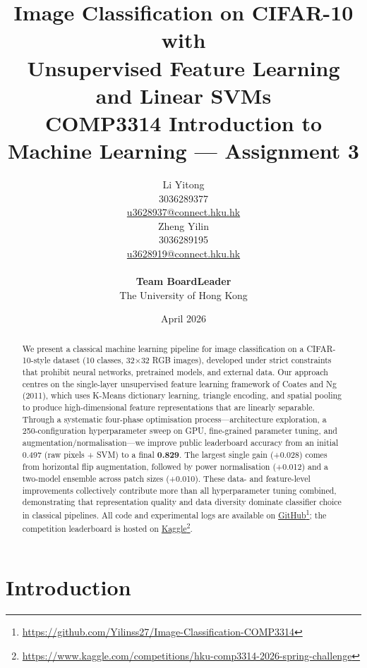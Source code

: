 \documentclass[11pt,a4paper]{article}
\title{%
  \textbf{Image Classification on CIFAR-10 with\\
  Unsupervised Feature Learning and Linear SVMs}\\[6pt]
  \large COMP3314 Introduction to Machine Learning --- Assignment 3
}
\author{%
  \begin{tabular}[t]{c}
    Li Yitong\\
    \small 3036289377\\
    \small \href{mailto:u3628937@connect.hku.hk}{u3628937@connect.hku.hk}
  \end{tabular}
  \hspace{3em}
  \begin{tabular}[t]{c}
    Zheng Yilin\\
    \small 3036289195\\
    \small \href{mailto:u3628919@connect.hku.hk}{u3628919@connect.hku.hk}
  \end{tabular}
  \\[40pt]
  \small\textbf{Team BoardLeader}\\
  \small The University of Hong Kong
}
\date{April 2026}
\begin{document}
\maketitle

\begin{abstract}
We present a classical machine learning pipeline for image classification on a
CIFAR-10-style dataset (10 classes, 32$\times$32 RGB images), developed under
strict constraints that prohibit neural networks, pretrained models, and
external data.  Our approach centres on the single-layer unsupervised feature
learning framework of Coates and Ng (2011), which uses K-Means dictionary
learning, triangle encoding, and spatial pooling to produce high-dimensional
feature representations that are linearly separable.  Through a systematic
four-phase optimisation process---architecture exploration, a 250-configuration
hyperparameter sweep on GPU, fine-grained parameter tuning, and
augmentation/normalisation---we improve public leaderboard accuracy from an
initial 0.497 (raw pixels + SVM) to a final \textbf{0.829}.  The largest
single gain (+0.028) comes from horizontal flip augmentation, followed by
power normalisation (+0.012) and a two-model ensemble across patch sizes
(+0.010).  These data- and feature-level improvements collectively contribute
more than all hyperparameter tuning combined, demonstrating that
representation quality and data diversity dominate classifier choice in
classical pipelines.
All code and experimental logs are available on
\href{https://github.com/Yilinss27/Image-Classification-COMP3314}{GitHub}\footnote{\url{https://github.com/Yilinss27/Image-Classification-COMP3314}};
the competition leaderboard is hosted on
\href{https://www.kaggle.com/competitions/hku-comp3314-2026-spring-challenge}{Kaggle}\footnote{\url{https://www.kaggle.com/competitions/hku-comp3314-2026-spring-challenge}}.
\end{abstract}

\tableofcontents
\newpage

\section{Introduction}
\label{sec:introduction}
\end{document}
